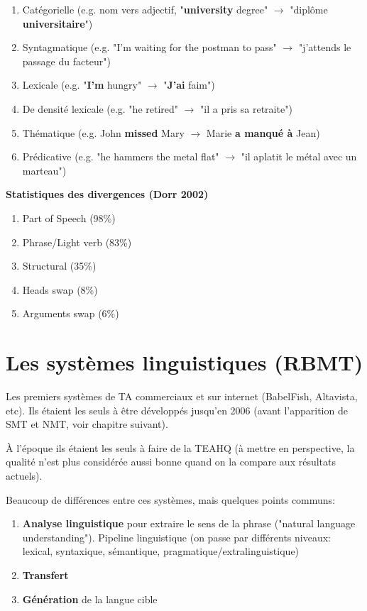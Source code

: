 \begin{enumerate}
    \item Catégorielle (e.g. nom vers adjectif, "\textbf{university} degree" $\rightarrow$ "diplôme \textbf{universitaire}")
    \item Syntagmatique (e.g. "I’m waiting for the postman to pass" $\rightarrow$ "j’attends le passage du facteur")
    \item Lexicale (e.g. "\textbf{I'm} hungry" $\rightarrow$ "\textbf{J'ai} faim")
    \item De densité lexicale (e.g. "he retired" $\rightarrow$ "il a pris sa retraite")
    \item Thématique (e.g. John \textbf{missed} Mary $\rightarrow$ Marie \textbf{a manqué à} Jean)
    \item Prédicative (e.g. "he hammers the metal flat" $\rightarrow$ "il aplatit le métal avec un marteau")\\
\end{enumerate}

\noindent\textbf{Statistiques des divergences (Dorr 2002)\\}

\begin{enumerate}
    \item Part of Speech (98\%)
    \item Phrase/Light verb (83\%)
    \item Structural (35\%)
    \item Heads swap (8\%)
    \item Arguments swap (6\%)
\end{enumerate}

\newpage

\section{Les systèmes linguistiques (RBMT)}
\label{sec:RBMT}

Les premiers systèmes de TA commerciaux et sur internet (BabelFish, Altavista, etc).
Ils étaient les seuls à être développés jusqu'en 2006 (avant l'apparition de SMT et NMT, voir chapitre suivant).

À l'époque ils étaient les seuls à faire de la TEAHQ (à mettre en perspective, la qualité n'est plus considérée aussi bonne quand on la compare aux résultats actuels).

Beaucoup de différences entre ces systèmes, mais quelques points communs:

\begin{enumerate}
    \item \textbf{Analyse linguistique} pour extraire le sens de la phrase
    ("natural language understanding"). Pipeline linguistique (on passe par différents niveaux: lexical,
        syntaxique, sémantique, pragmatique/extralinguistique)
    \item \textbf{Transfert}
    \item \textbf{Génération} de la langue cible\\
\end{enumerate}

